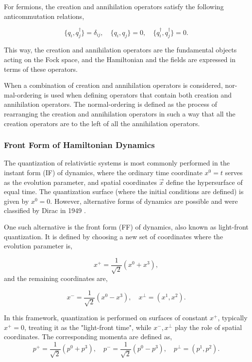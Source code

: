 \documentclass[11pt,a4paper,twoside,pdf]{article}
\numberwithin{equation}{section}
\begin{document}
For fermions, the creation and annihilation operators satisfy the following anticommutation
relations,

\begin{equation}
    \{q_i, q_j^\dagger\} = \delta_{ij}, \quad
    \{q_i, q_j\} = 0, \quad
    \{q_i^\dagger, q_j^\dagger\} = 0.
\end{equation}

This way, the creation and annihilation operators are the fundamental objects acting
on the Fock space, and the Hamiltonian and the fields are expressed in terms of 
these operators.

When a combination of creation and annihilation operators is considered, 
nor- mal-ordering is
used when defining operators that contain both creation and annihilation operators.
The normal-ordering is defined as the 
process of rearranging the creation and annihilation operators in such a way that 
all the creation operators are to the left of all the annihilation operators.

\newpage

\subsubsection{Front Form of Hamiltonian Dynamics}
The quantization of relativistic systems is most commonly performed in the instant form 
(IF) of dynamics, where the ordinary time coordinate \( x^0 = t \) serves as the evolution 
parameter, and spatial coordinates \( \vec{x} \) define the hypersurface of equal time.
The quantization surface (where the initial conditions are defined) is given by $x^0 = 0$.
However, alternative forms of dynamics are possible and were classified by Dirac in 
1949 \cite{dirac_front_forms_1949}.

One such alternative is the front form (FF) of dynamics, also known as light-front 
quantization. It is defined by choosing a new set of coordinates where the evolution 
parameter is,

\begin{equation}
    x^+ = \frac{1}{\sqrt{2}} (x^0 + x^3),
\end{equation}
and the remaining coordinates are,

\begin{equation}
    x^- = \frac{1}{\sqrt{2}} (x^0 - x^3), \quad x^\perp = (x^1, x^2).
\end{equation}

In this framework, quantization is performed on surfaces of constant \( x^+ \), 
typically $x^+=0$,
treating it as the "light-front time", while \( x^-, x^\perp \) play the role 
of spatial coordinates. The corresponding momenta are defined as,
\begin{equation}
    p^+ = \frac{1}{\sqrt{2}} (p^0 + p^3), \quad
    p^- = \frac{1}{\sqrt{2}} (p^0 - p^3), \quad
    p^\perp = (p^1, p^2).
\end{equation}
\end{document}
